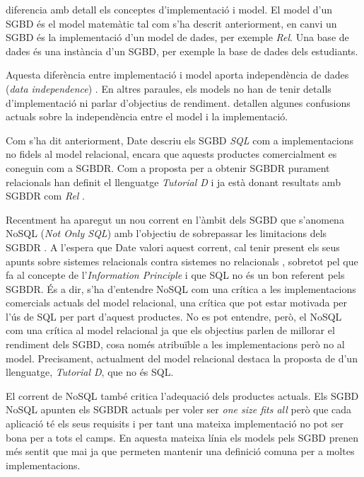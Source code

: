 \textcite{date:introduction} diferencia amb detall els conceptes d'implementació i model.
El model d'un SGBD és el model matemàtic tal com s'ha descrit anteriorment, en canvi un SGBD és la implementació d'un model de dades, per exemple \emph{Rel}.
Una base de dades és una instància d'un SGBD, per exemple la base de dades dels estudiants.



Aquesta diferència entre implementació i model aporta independència de dades (\emph{data independence}) \parencite{date:dictionary}. En altres paraules, els models no han de tenir detalls d'implementació ni parlar d'objectius de rendiment. 
\textcite{dbdebunk} detallen algunes confusions actuals sobre la independència entre el model i la implementació.


Com s'ha dit anteriorment, Date descriu els SGBD \emph{SQL} com a implementacions no fidels al model relacional, encara que aquests productes comercialment es coneguin com a SGBDR. Com a proposta per a obtenir SGBDR purament relacionals \textcite{date05,date:tutoriald} han definit el llenguatge \emph{Tutorial D} i ja està donant resultats amb SGBDR com \emph{Rel} .


Recentment ha aparegut un nou corrent en l'àmbit dels SGBD que s'anomena NoSQL (\emph{Not Only SQL}) amb l'objectiu de sobrepassar les limitacions dels SGBDR \parencite{edlich:nosql,stonebraker10}. 
A l'espera que Date valori aquest corrent, cal tenir present els seus apunts sobre sistemes relacionals contra sistemes no relacionals \parencite[part 7]{date06}, sobretot pel que fa al concepte de l'\emph{Information Principle} i que SQL no és un bon referent pels SGBDR. És a dir, s'ha d'entendre NoSQL com una crítica a les implementacions comercials actuals del model relacional, una crítica que pot estar motivada per l'ús de SQL per part d'aquest productes. 
No es pot entendre, però, el NoSQL com una crítica al model relacional ja que els objectius parlen de millorar el rendiment dels SGBD, cosa només atribuïble a les implementacions però no al model. Precisament, actualment del model relacional destaca la proposta de \citeauthor{date:tutoriald} d'un llenguatge, \emph{Tutorial D}, que no és SQL.


El corrent de NoSQL també critica l'adequació dels productes actuals.
Els SGBD NoSQL apunten els SGBDR actuals per voler ser \emph{one size fits all} \parencite{stonebraker07,stonebraker09} però que cada aplicació té els seus requisits i per tant una mateixa implementació no pot ser bona per a tots el camps.
En aquesta mateixa línia els models pels SGBD prenen més sentit que mai ja que permeten mantenir una definició comuna per a moltes implementacions.


